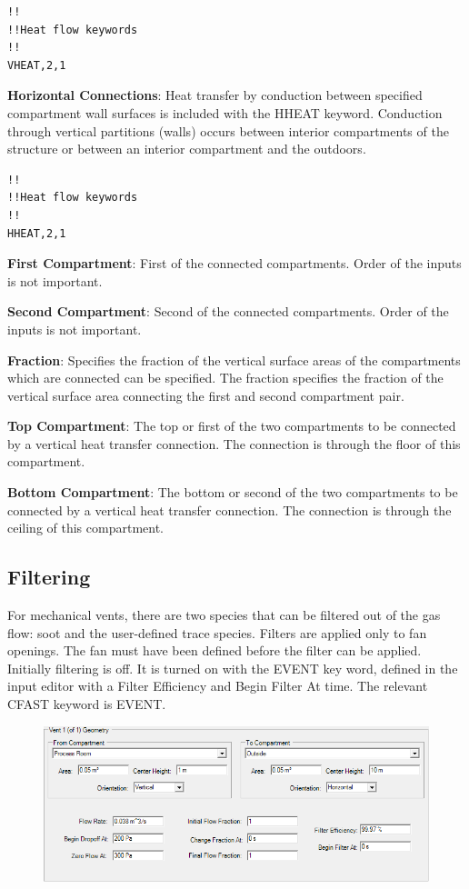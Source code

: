 \begin{lstlisting}
!!
!!Heat flow keywords
!!
VHEAT,2,1
\end{lstlisting}

\textbf{Horizontal Connections}: Heat transfer by conduction between specified compartment wall surfaces is included with the HHEAT keyword.  Conduction through vertical partitions (walls) occurs between interior compartments of the structure or between an interior compartment and the outdoors.

\begin{lstlisting}
!!
!!Heat flow keywords
!!
HHEAT,2,1
\end{lstlisting}

\textbf{First Compartment}: First of the connected compartments. Order of the inputs is not important.

\textbf{Second Compartment}: Second of the connected compartments. Order of the inputs is not important.

\textbf{Fraction}: Specifies the fraction of the vertical surface areas of the compartments which are connected can be specified. The fraction specifies the fraction of the vertical surface area connecting the first and second compartment pair.

\textbf{Top Compartment}: The top or first of the two compartments to be connected by a vertical heat transfer connection. The connection is through the floor of this compartment.

\textbf{Bottom Compartment}: The bottom or second of the two compartments to be connected by a vertical heat transfer connection. The connection is through the ceiling of this compartment.

\subsection{Filtering}

For mechanical vents, there are two species that can be filtered out of the gas flow: soot and the user-defined trace species. Filters are applied only to fan openings. The fan must have been defined before the filter can be applied. Initially filtering is off. It is turned on with the EVENT key word, defined in the input editor with a Filter Efficiency and Begin Filter At time. The relevant CFAST keyword is EVENT.

\begin{figure}[h!]
\begin{center}
\includegraphics[width=6.5in]{FIGURES/Input_File/Filtering}
\end{center}
\end{figure}

